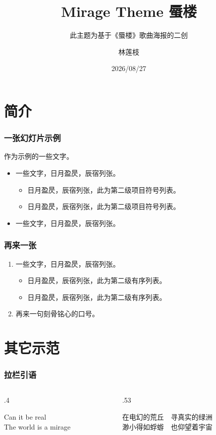 \documentclass[aspectratio=1610,linespread=1.4,t]{ctexbeamer}
\title{Mirage Theme 蜃楼}
\subtitle{此主题为基于《蜃楼》歌曲海报的二创}
\author{林莲枝}
\institute{（可选填）某某大学某某单位}
\date{2026/08/27}
\begin{document}
\frame{\maketitle}

\section{简介}
\begin{frame}
\frametitle{一张幻灯片示例}

作为示例的一些文字。

\begin{itemize}
    \item  一些文字，日月盈昃，辰宿列张。
    \begin{itemize}
        \item 日月盈昃，辰宿列张，此为第二级项目符号列表。
        \item 日月盈昃，辰宿列张，此为第二级项目符号列表。
    \end{itemize}
    \item 一些文字，日月盈昃，辰宿列张。
\end{itemize}

\end{frame}

\begin{frame}
\frametitle{再来一张}
\begin{enumerate}
    \item  一些文字，日月盈昃，辰宿列张。
    \begin{itemize}
        \item 日月盈昃，辰宿列张，此为第二级有序列表。
        \item 日月盈昃，辰宿列张，此为第二级有序列表。
    \end{itemize}
\item 再来一句\alert{刻骨铭心的口号}。
\end{enumerate}
\end{frame}

\section{其它示范}

\begin{frame}[c]
\frametitle{拉栏引语}
\begin{columns}
\begin{column}{.4\textwidth}
\begin{pullquote}
    Can it be real\\
    The world is a mirage
\end{pullquote}
\end{column}

\begin{column}{.53\textwidth}
\renewcommand{\MiragePullquoteOpen}{\hskip-.2\ccwd『}
\begin{pullquote}
在电幻的荒丘　寻真实的绿洲\\
渺小得如蜉蝣　也仰望着宇宙
\end{pullquote}
\end{column}
\end{columns}
\end{frame}
\end{document}
